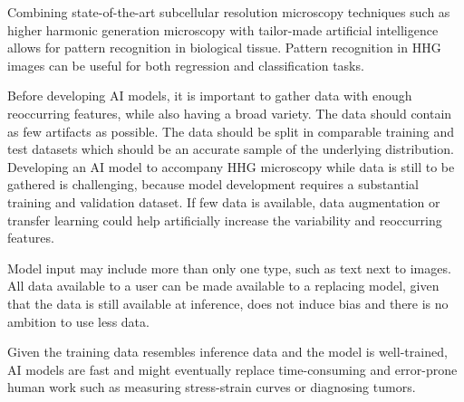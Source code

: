 Combining state-of-the-art subcellular resolution microscopy techniques such as higher harmonic generation microscopy with tailor-made artificial intelligence allows for pattern recognition in biological tissue.
Pattern recognition in HHG images can be useful for both regression and classification tasks.

Before developing AI models, it is important to gather data with enough reoccurring features, while also having a broad variety.
The data should contain as few artifacts as possible.
The data should be split in comparable training and test datasets which should be an accurate sample of the underlying distribution.
Developing an AI model to accompany HHG microscopy while data is still to be gathered is challenging, because model development requires a substantial training and validation dataset.
If few data is available, data augmentation or transfer learning could help artificially increase the variability and reoccurring features.

Model input may include more than only one type, such as text next to images.
All data available to a user can be made available to a replacing model, given that the data is still available at inference, does not induce bias and there is no ambition to use less data.

Given the training data resembles inference data and the model is well-trained, AI models are fast and might eventually replace time-consuming and error-prone human work such as measuring stress-strain curves or diagnosing tumors.
